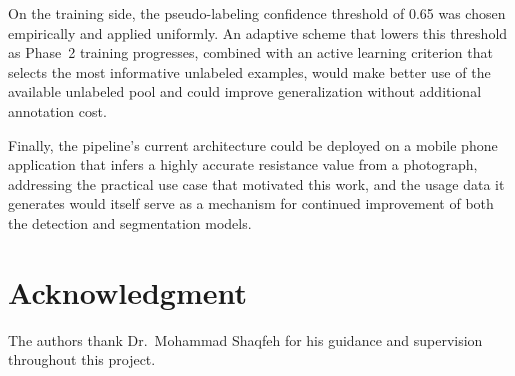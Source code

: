 \documentclass[conference]{IEEEtran}
\begin{document}
On the training side, the pseudo-labeling confidence
threshold of 0.65 was chosen empirically and applied
uniformly.
An adaptive scheme that lowers this threshold as Phase~2
training progresses, combined with an active learning
criterion that selects the most informative unlabeled
examples, would make better use of the available unlabeled
pool and could improve generalization without additional
annotation cost. 
 
Finally, the pipeline's current architecture could be deployed on a mobile phone application that infers a highly accurate resistance value from a
photograph, addressing the practical use case that
motivated this work, and the usage data it generates would
itself serve as a mechanism for continued improvement of both
the detection and segmentation models.
 
\section*{Acknowledgment}
The authors thank Dr.\ Mohammad Shaqfeh for his guidance and supervision throughout this project.
 


 
\end{document}
